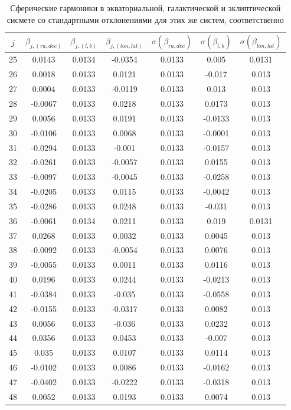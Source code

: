 \documentclass[14pt]{article} %
\begin{document}
\newpage

\begin{table}[h!]
\centering
\caption{Сферические гармоники в экваториальной, галактической и эклиптической сисмете со стандартными отклонениями для этих же систем, соответственно}
\label{tabular:sf_all2}
\begin{tabular}{|c|c|c|c|c|c|c|}
\hline 	
$j$ &$\beta_{j,(ra,dec)}$ &$\beta_{j,(l,b)}$ &$\beta_{j,(lon,lat)}$ &$\sigma(\beta_{ra,dec})$ &$\sigma(\beta_{l,b})$ & $\sigma(\beta_{lon,lat})$\\
\hline 
25 &0.0143 &0.0134 &-0.0354 &0.0133 &0.005 &0.0131\\
26 &0.0018 &0.0133 &0.0121 &0.0133 &-0.017 &0.013\\
27 &0.0004 &0.0133 &-0.0119 &0.0133 &0.013 &0.013\\
28 &-0.0067 &0.0133 &0.0218 &0.0133 &0.0173 &0.013\\
29 &0.0056 &0.0133 &0.0191 &0.0133 &-0.0133 &0.013\\
30 &-0.0106 &0.0133 &0.0068 &0.0133 &-0.0001 &0.013\\
31 &-0.0294 &0.0133 &-0.001 &0.0133 &-0.0157 &0.013\\
32 &-0.0261 &0.0133 &-0.0057 &0.0133 &0.0155 &0.013\\
33 &-0.0097 &0.0133 &-0.0045 &0.0133 &-0.0258 &0.013\\
34 &-0.0205 &0.0133 &0.0115 &0.0133 &-0.0042 &0.013\\
35 &-0.0286 &0.0133 &0.0248 &0.0133 &-0.031 &0.013\\
36 &-0.0061 &0.0134 &0.0211 &0.0133 &0.019 &0.0131\\
37 &0.0268 &0.0133 &0.0032 &0.0133 &0.0045 &0.013\\
38 &-0.0092 &0.0133 &-0.0054 &0.0133 &0.0076 &0.013\\
39 &-0.0055 &0.0133 &0.0011 &0.0133 &0.0116 &0.013\\
40 &0.0196 &0.0133 &0.0244 &0.0133 &-0.0213 &0.013\\
41 &-0.0384 &0.0133 &-0.035 &0.0133 &-0.0558 &0.013\\
42 &-0.0155 &0.0133 &-0.0317 &0.0133 &0.0082 &0.013\\
43 &0.0056 &0.0133 &-0.036 &0.0133 &0.0232 &0.013\\
44 &0.0356 &0.0133 &0.0453 &0.0133 &-0.007 &0.013\\
45 &0.035 &0.0133 &0.0107 &0.0133 &0.0114 &0.013\\
46 &-0.0102 &0.0133 &0.0086 &0.0133 &-0.0162 &0.013\\
47 &-0.0402 &0.0133 &-0.0222 &0.0133 &-0.0318 &0.013\\
48 &0.0052 &0.0133 &0.0193 &0.0133 &0.0074 &0.013\\
\hline 
\end{tabular}
\end{table}
\end{document}
